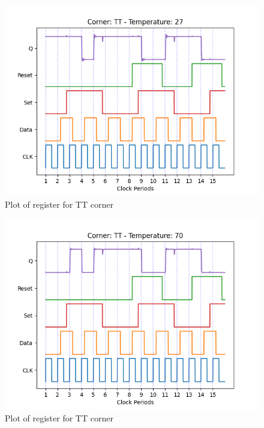 \begin{figure}[H]
    \centering
    \includegraphics[width=\textwidth]{Figures/Aimspice_Plots/TT_27.png}
    \caption{Plot of register for TT corner}
    \label{fig:TT27}
\end{figure}

\begin{figure}[H]
    \centering
    \includegraphics[width=\textwidth]{Figures/Aimspice_Plots/TT_70.png}
    \caption{Plot of register for TT corner}
    \label{fig:TT70}
\end{figure}


